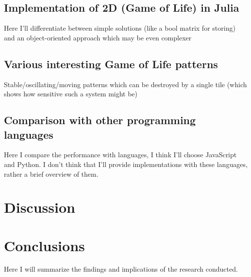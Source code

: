 \documentclass[a4paper,12pt]{llncs}
\numberwithin{equation}{section}
\begin{document}
\subsection{Implementation of 2D (Game of Life) in Julia}
Here I'll differentiate between simple solutions (like a bool matrix for storing)
and an object-oriented approach which may be even complexer
\subsection{Various interesting Game of Life patterns}
Stable/oscillating/moving patterns which can be destroyed by a single tile (which shows how sensitive such a system might be)
\subsection{Comparison with other programming languages}
Here I compare the performance with languages, I think I'll choose JavaScript and Python.
I don't think that I'll provide implementations with these languages, rather a brief overview of them.
\section{Discussion}
\section{Conclusions}
Here I will summarize the findings and implications of the research conducted.



\end{document}
